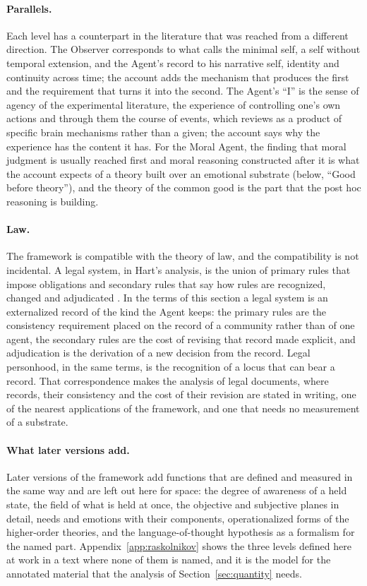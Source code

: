 \paragraph{Parallels.}
Each level has a counterpart in the literature that was reached from a different direction. The
Observer corresponds to what \citet{gallagher2000} calls the minimal self, a self without temporal
extension, and the Agent's record to his narrative self, identity and continuity across time; the
account adds the mechanism that produces the first and the requirement that turns it into the
second. The Agent's ``I'' is the sense of agency of the experimental literature, the experience of
controlling one's own actions and through them the course of events, which \citet{haggard2017}
reviews as a product of specific brain mechanisms rather than a given; the account says why the
experience has the content it has. For the Moral Agent, the finding that moral judgment is usually
reached first and moral reasoning constructed after it \citep{haidt2001} is what the account expects
of a theory built over an emotional substrate (below, ``Good before theory''), and the theory of the
common good is the part that the post hoc reasoning is building.

\paragraph{Law.}
The framework is compatible with the theory of law, and the compatibility is not incidental. A legal
system, in Hart's analysis, is the union of primary rules that impose obligations and secondary rules
that say how rules are recognized, changed and adjudicated \citep{hart1961}. In the terms of this
section a legal system is an externalized record of the kind the Agent keeps: the primary rules are
the consistency requirement placed on the record of a community rather than of one agent, the
secondary rules are the cost of revising that record made explicit, and adjudication is the
derivation of a new decision from the record. Legal personhood, in the same terms, is the recognition
of a locus that can bear a record. That correspondence makes the analysis of legal documents, where
records, their consistency and the cost of their revision are stated in writing, one of the nearest
applications of the framework, and one that needs no measurement of a substrate.

\paragraph{What later versions add.}
Later versions of the framework add functions that are defined and measured in the same way and are
left out here for space: the degree of awareness of a held state, the field of what is held at once,
the objective and subjective planes in detail, needs and emotions with their components,
operationalized forms of the higher-order theories, and the language-of-thought hypothesis as a
formalism for the named part. Appendix~\ref{app:raskolnikov} shows the three levels defined here at
work in a text where none of them is named, and it is the model for the annotated material that the
analysis of Section~\ref{sec:quantity} needs.

